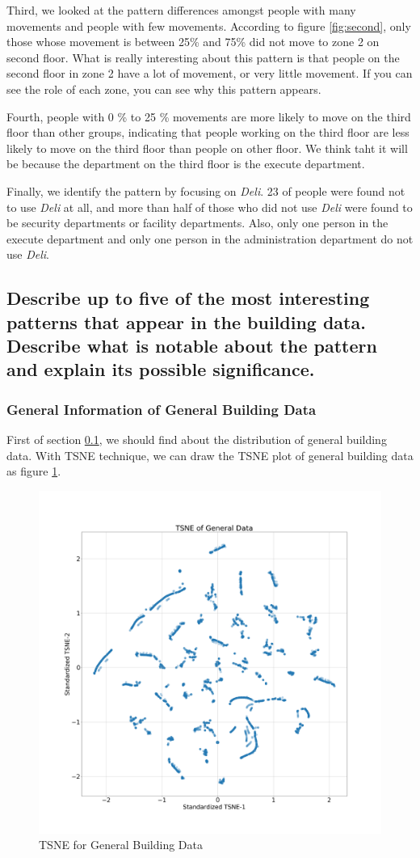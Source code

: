 \documentclass[aps, 10pt, a4paper]{article}
\begin{document}
                Third, we looked at the pattern differences amongst people with many movements and people with few movements. According to figure \ref{fig:second}, only those whose movement is between 25\% and 75\% did not move to zone 2 on second floor. What is really interesting about this pattern is that people on the second floor in zone 2 have a lot of movement, or very little movement. If you can see the role of each zone, you can see why this pattern appears. 
                
                Fourth, people with 0 \% to 25 \% movements are more likely to move on the third floor than other groups, indicating that people working on the third floor are less likely to move on the third floor than people on other floor. We think taht it will be because the department on the third floor is the execute department. 
                
                Finally, we identify the pattern by focusing on \textit{Deli}. 23 of people were found not to use \textit{Deli} at all, and more than half of those who did not use \textit{Deli} were found to be security departments or facility departments. Also, only one person in the execute department and only one person in the administration department do not use \textit{Deli}.
        
        \subsection[Question 2]{Describe up to five of the most interesting patterns that appear in the building data. Describe what is notable about the pattern and explain its possible significance.}
            \label{sec:question2}
            \subsubsection{General Information of General Building Data}
                First of section \ref{sec:question2}, we should find about the distribution of general building data. With TSNE technique, we can draw the TSNE plot of general building data as figure \ref{fig:tsnegeneral}.
                
                \begin{figure}[htbp]
                    \centering
                    \includegraphics[width=0.4 \linewidth]{figures/TsneGeneral.png}
                    \caption{TSNE for General Building Data}
                    \label{fig:tsnegeneral}
                \end{figure}
            
\end{document}
